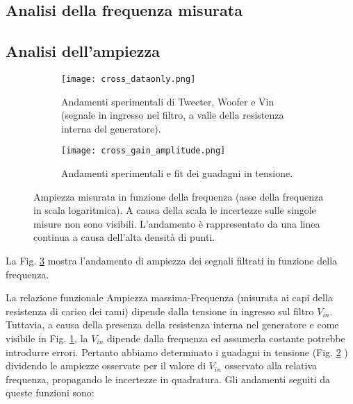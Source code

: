 \documentclass[../Relazione_circuiti]{subfiles}
\begin{document}
\subsection{Analisi della frequenza misurata}

\subsection{Analisi dell'ampiezza}

  \begin{figure}[H]
    \centering

    \begin{subfigure}[t]{=0.49\textwidth}

      \texttt{[image: cross\_dataonly.png]}

      \caption{Andamenti sperimentali di Tweeter, Woofer e Vin (segnale in ingresso nel filtro,
        a valle della resistenza interna del generatore).}
      \label{fig: amplitude_dataonly}

    \end{subfigure}
    \hfill
    \begin{subfigure}[t]{=0.49\textwidth}

      \texttt{[image: cross\_gain\_amplitude.png]}

      \caption
      {Andamenti sperimentali e fit dei guadagni in tensione.}
      \label{fig:cross_gain}
    \end{subfigure}

    \caption{Ampiezza misurata in funzione della frequenza (asse della frequenza in scala logaritmica). A causa della scala le incertezze sulle singole misure non sono visibili. L'andamento è rappresentato da una
      linea continua a causa dell'alta densità di punti.}
    \label{fig:cross_amplitude}

  \end{figure}

  La Fig. \ref{fig:cross_amplitude} mostra l'andamento di ampiezza dei segnali filtrati in funzione della frequenza.

  La relazione funzionale Ampiezza massima-Frequenza (misurata ai capi della resistenza di carico dei rami) dipende
  dalla tensione in ingresso sul filtro $V_{in}$.
  Tuttavia, a causa della presenza della resistenza interna nel generatore e come visibile in Fig.
  \ref{fig: amplitude_dataonly}, la $V_{in}$
  dipende dalla frequenza ed assumerla costante potrebbe introdurre errori.
  Pertanto abbiamo determinato i guadagni in tensione (Fig. \ref{fig:cross_gain}
  ) dividendo le ampiezze osservate per il valore di $V_{in}$
  osservato alla relativa frequenza, propagando le incertezze in quadratura. Gli andamenti seguiti da queste funzioni sono: 
\end{document}
